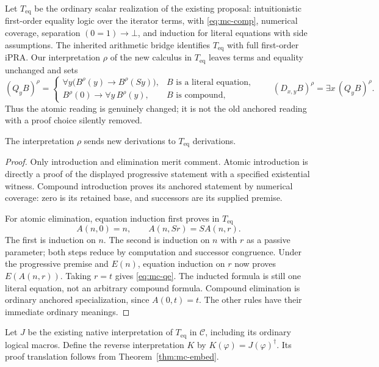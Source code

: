 Let $T_{\mathrm{eq}}$ be the ordinary scalar realization of the existing
proposal: intuitionistic first-order equality logic over the iterator
terms, with \eqref{eq:mc-comp}, numerical coverage, separation
$(0=1)\to\bot$, and induction for literal equations with side assumptions.
The inherited arithmetic bridge identifies $T_{\mathrm{eq}}$ with
full first-order iPRA.  Our interpretation $\rho$ of the new calculus
in $T_{\mathrm{eq}}$ leaves terms and equality unchanged and sets
\[
 (Q_yB)^\rho=
 \begin{cases}
 \forall y\bigl(B^\rho(y)\to B^\rho(Sy)\bigr),
       &B\text{ is a literal equation},\\
 B^\rho(0)\to\forall y\,B^\rho(y),&B\text{ is compound},
 \end{cases}
 \qquad
 (D_{x,y}B)^\rho=\exists x\,(Q_yB)^\rho.
 \tag{MC10}\label{eq:mc-reading}
\]
Thus the atomic reading is genuinely changed; it is not the old
anchored reading with a proof choice silently removed.

\begin{lemma}
\label{lem:mc-sound}
The interpretation $\rho$ sends new derivations to
$T_{\mathrm{eq}}$ derivations.
\end{lemma}
\begin{proof}
Only introduction and elimination merit comment.  Atomic introduction
is directly a proof of the displayed progressive statement with a
specified existential witness.  Compound introduction proves its
anchored statement by numerical coverage: zero is its retained base,
and successors are its supplied premise.

For atomic elimination, equation induction first proves in
$T_{\mathrm{eq}}$
\[
 A(n,0)=n,\qquad A(n,Sr)=S A(n,r).
\]
The first is induction on $n$.  The second is induction on $n$ with
$r$ as a passive parameter; both steps reduce by computation and
successor congruence.  Under the progressive premise and $E(n)$,
equation induction on $r$ now proves $E(A(n,r))$.  Taking $r=t$
gives \eqref{eq:mc-qe}.  The inducted formula is still one literal
equation, not an arbitrary compound formula.  Compound elimination
is ordinary anchored specialization, since $A(0,t)=t$.
The other rules have their immediate ordinary meanings.
\end{proof}

Let $J$ be the existing native interpretation of $T_{\mathrm{eq}}$
in $\mathcal C$, including its ordinary logical macros.  Define the
reverse interpretation $K$ by $K(\varphi)=J(\varphi)^\dagger$.
Its proof translation follows from Theorem~\ref{thm:mc-embed}.

